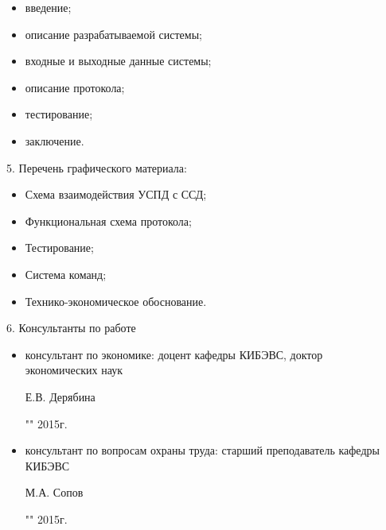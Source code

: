 \begin{itemize}
 \item введение;
 \item описание разрабатываемой системы;
 \item входные и выходные данные системы;
 \item описание протокола;
 \item тестирование;
 \item заключение.
\end{itemize}

5. Перечень графического материала:

\begin{itemize}
 \item Схема взаимодействия УСПД с ССД;
 \item Функциональная схема протокола;
 \item Тестирование;
 \item Система команд;
 \item Технико-экономическое обоснование.
\end{itemize}

6. Консультанты по работе

\begin{itemize}
 \item консультант по экономике: доцент кафедры КИБЭВС, доктор \\ экономических наук \\
 \begin{singlespace}
 Е.В. Дерябина \hfill \underline{\hspace{6cm}} \\
 \begin{flushright} "\underline{\hspace{1cm}}"\underline{\hspace{3cm}} 2015г. \end{flushright}
 \end{singlespace}
 \item консультант по вопросам охраны труда: старший преподаватель кафедры КИБЭВС\\
 \begin{singlespace}
 М.А. Сопов \hfill \underline{\hspace{6cm}} \\
 \begin{flushright} "\underline{\hspace{1cm}}"\underline{\hspace{3cm}} 2015г. \end{flushright}
 \end{singlespace}
\end{itemize}

